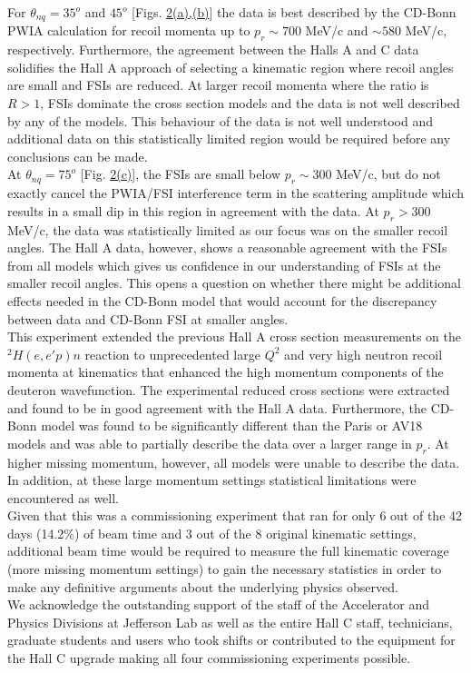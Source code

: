 \indent For $\theta_{nq}=35^{o}$ and $45^{o}$ [Figs. \hyperref[fig:fig2]{2(a),(b)}] the data is best described by the CD-Bonn PWIA calculation for recoil momenta up to $p_{r}\sim700$ MeV/c and $\sim580$ MeV/c, respectively.
Furthermore, the agreement between the Halls A and C data solidifies the Hall A approach of selecting a kinematic region where recoil angles are small and FSIs are reduced.
At larger recoil momenta where the ratio is $R>1$, FSIs dominate the cross section models and the data is not well described by any of the models. This behaviour of the data is not well understood
and additional data on this statistically limited region would be required before any conclusions can be made. \\
\indent At $\theta_{nq}=75^{o}$ [Fig. \hyperref[fig:fig2]{2(c)}], the FSIs are small below $p_{r}\sim$300 MeV/c, but do not exactly cancel the PWIA/FSI interference term in the scattering amplitude which results in a small dip in this region in agreement with the data.
At $p_{r}>300$ MeV/c, the data was statistically limited as our focus was on the smaller recoil angles. The Hall A data, however, shows a reasonable agreement with the FSIs from all models which gives us confidence in our understanding
of FSIs at the smaller recoil angles. This opens a question on whether there might be additional effects needed in the CD-Bonn model that would account for the discrepancy between data and CD-Bonn FSI at smaller angles. \\
\indent This experiment extended the previous Hall A cross section measurements on the $^{2}H(e,e'p)n$ reaction to 
unprecedented large $Q^{2}$ and very high neutron recoil momenta at kinematics that enhanced the high momentum components of the deuteron wavefunction.
The experimental reduced cross sections were extracted and found to be in good agreement with the Hall A data. Furthermore, the CD-Bonn model was found to be
significantly different than the Paris or AV18 models and was able to partially describe the data over a larger range in $p_{r}$.
At higher missing momentum, however, all models were unable to describe the data. In addition, at these large momentum settings statistical limitations were encountered as well.\\
\indent Given that this was a commissioning experiment that ran for only 6 out of the 42 days (14.2$\%$) of beam time and 3 out of the 8 original kinematic settings,
additional beam time would be required to measure the full kinematic coverage (more missing momentum settings) to gain the necessary statistics 
in order to make any definitive arguments about the underlying physics observed. \\
\indent We acknowledge the outstanding support of the staff of the Accelerator and Physics Divisions at Jefferson Lab
as well as the entire Hall C staff, technicians, graduate students and users who took shifts or contributed
to the equipment for the Hall C upgrade making all four commissioning experiments possible. 

